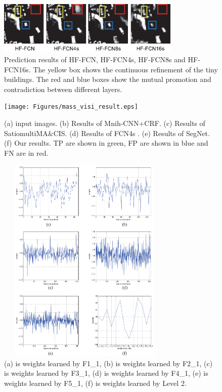 \begin{figure}
\centering
\includegraphics[width=8.7cm]{Figures/HF-FCN_variants_result.eps}
\caption{Prediction results of HF-FCN, HF-FCN4s, HF-FCN8s and HF-FCN16s. The yellow box shows the continuous refinement of the tiny buildings. The red and blue boxes show the mutual promotion and contradiction between different layers.}
\label{9}
\end{figure}

\begin{figure}
\centering
\texttt{[image: Figures/mass\_visi\_result.eps]}
\caption{(a) input images. (b) Results of Mnih-CNN+CRF. (c) Results of Satio\-multi\-MA\&CIS. (d) Results of FCN4s . (e) Results of SegNet. (f) Our results. TP are shown in green, FP are shown in blue and FN are in red.}
\label{10}
\end{figure}

\begin{figure}
\centering
\includegraphics[width=8.4cm, height = 10cm]{Figures/weights.eps}
\caption{(a) is weights learned by F1\_1, (b) is weights learned by F2\_1, (c) is weights learned by F3\_1, (d) is weights learned by F4\_1, (e) is weights learned by F5\_1, (f) is weights learned by Level 2.}
\label{11}
\end{figure}

